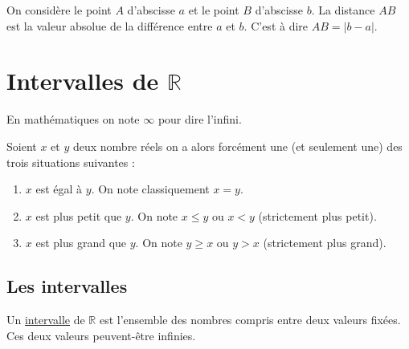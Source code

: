 \documentclass[10pt,a4paper,oneside]{book}
\newcommand{\R}{\mathbb{R}}
\begin{document}
\begin{prop} On considère le point $A$ d'abscisse $a$ 
  et le point $B$ d'abscisse $b$. La distance $AB$ est la valeur absolue de la 
  différence entre $a$ et $b$. C'est à dire $AB=|b-a|$. 
\end{prop}
  \section{Intervalles de $\R$}
  
  \begin{de}
    En mathématiques on note $\infty$ pour dire l'infini.
  \end{de}
  

  \begin{de}[Ordre]
    Soient $x$ et $y$ deux nombre réels on a alors forcément une (et seulement une) des trois situations suivantes :
    \begin{enumerate}
      \item $x$ est égal à $y$. On note classiquement $x=y$.
      \item $x$ est plus petit que $y$. On note $x\leq y$ ou $x<y$ (strictement plus petit). 
      \item $x$ est plus grand que $y$. On note $y\geq x$ ou $y>x$ (strictement plus 
      grand). 
    \end{enumerate}
  \end{de}
  
  \subsection{Les intervalles}
  
  \begin{de}[intervalle]
    Un \underline{intervalle} de $\R$ est l'ensemble des nombres compris entre deux valeurs 
    fixées. Ces deux valeurs peuvent-être infinies. 
  \end{de}
  
\end{document}
